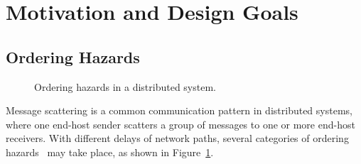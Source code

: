 \section{Motivation and Design Goals}
\label{sec:motivation}

\subsection{Ordering Hazards}
\label{subsec:tso}


\begin{figure}[t]
\centering
    \hspace{0.01\textwidth}
    \hspace{0.01\textwidth}
	\caption{Ordering hazards in a distributed system.}
	\label{fig:ordering}
	\vspace{-1.5em}
\end{figure}


Message scattering is a common communication pattern in distributed systems, where one end-host sender scatters a group of messages to one or more end-host receivers.
With different delays of network paths, several categories of ordering hazards~\cite{gharachorloo1990memory,sewell2010x86} may take place, as shown in Figure~\ref{fig:ordering}.


